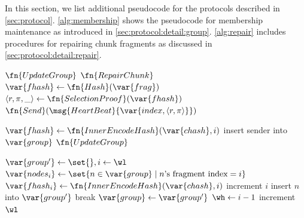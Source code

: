 In this section, we list additional pseudocode for the \sys protocols described in \autoref{sec:protocol}.
\autoref{alg:membership} shows the pseudocode for membership maintenance as introduced in \autoref{sec:protocol:detail:group}.
\autoref{alg:repair} includes procedures for repairing chunk fragments as discussed in \autoref{sec:protocol:detail:repair}.

\pagebreak

\begin{algorithm}[t]
    \begin{algorithmic}[1]
            \State $\fn{UpdateGroup}$
            \State $\fn{RepairChunk}$
        \EndProcedure
            \State $\var{fhash} \gets \fn{Hash}(\var{frag})$
            \State $\langle r, \pi, \_ \rangle \gets \fn{SelectionProof}(\var{fhash})$
                \State $\fn{Send}(\msg{HeartBeat}{\var{index, \langle r, \pi \rangle}})$
            \EndFor
        \EndProcedure





                \State \Return
            \EndIf
            \State $\var{fhash} \gets \fn{InnerEncodeHash}(\var{chash}, i)$
                \State insert sender into $\var{group}$
                \State $\fn{UpdateGroup}$
            \EndIf
        \EndProcedure
        
            \State $\var{group'} \gets \set{}, i \gets \wl$
                \State $\var{nodes_i} \gets \set{n \in \var{group} \mid n\textrm{'s fragment index} = i}$
                \State $\var{fhash_i} \gets \fn{InnerEncodeHash}(\var{chash}, i)$
                \State increment $i$
                    \State insert $n$ into $\var{group'}$
                \EndIf
                    \State break
                \EndIf
            \EndWhile
            \State $\var{group} \gets \var{group'}$
            \State $\wh \gets i - 1$
        \EndProcedure
            \State increment $\wl$
        \EndProcedure
    \end{algorithmic}
    \caption{Procedures to maintain group membership}
    \label{alg:membership}
\end{algorithm}

